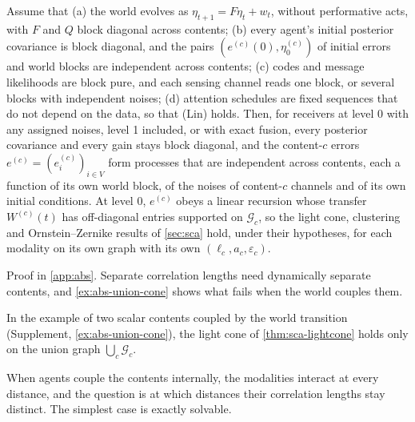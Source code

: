 \begin{proposition}\label{prop:abs-decoupling}
Assume that (a) the world evolves as $\eta_{t+1}=F\eta_t+w_t$, without performative acts, with $F$ and $Q$ block diagonal across contents; (b) every agent's initial posterior covariance is block diagonal, and the pairs $(e^{(c)}(0),\eta^{(c)}_0)$ of initial errors and world blocks are independent across contents; (c) codes and message likelihoods are block pure, and each sensing channel reads one block, or several blocks with independent noises; (d) attention schedules are fixed sequences that do not depend on the data, so that (Lin) holds. Then, for receivers at level 0 with any assigned noises, level 1 included, or with exact fusion, every posterior covariance and every gain stays block diagonal, and the content-$c$ errors $e^{(c)}=(e^{(c)}_i)_{i\in V}$ form processes that are independent across contents, each a function of its own world block, of the noises of content-$c$ channels and of its own initial conditions. At level 0, $e^{(c)}$ obeys a linear recursion whose transfer $W^{(c)}(t)$ has off-diagonal entries supported on $\mathcal G_c$, so the light cone, clustering and Ornstein--Zernike results of \cref{sec:sca} hold, under their hypotheses, for each modality on its own graph with its own $(\ell_c,a_c,\varepsilon_c)$.
\end{proposition}

Proof in \cref{app:abs}. Separate correlation lengths need dynamically separate contents, and \cref{ex:abs-union-cone} shows what fails when the world couples them.

In the example of two scalar contents coupled by the world transition (Supplement, \cref{ex:abs-union-cone}), the light cone of \cref{thm:sca-lightcone} holds only on the union graph $\bigcup_c\mathcal G_c$.

When agents couple the contents internally, the modalities interact at every distance, and the question is at which distances their correlation lengths stay distinct. The simplest case is exactly solvable.

